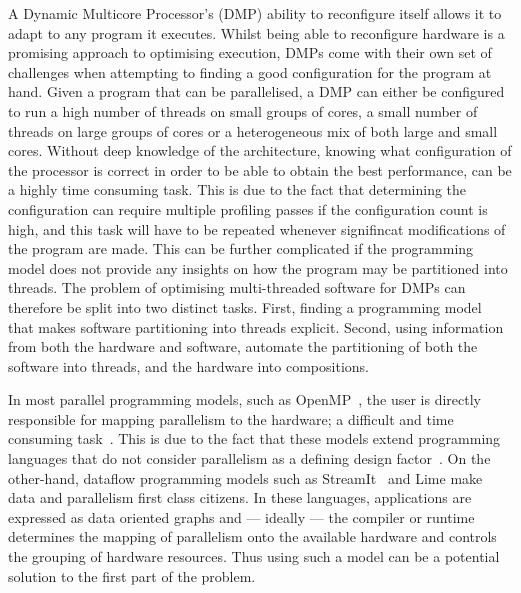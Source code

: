A Dynamic Multicore Processor's (DMP) ability to reconfigure itself allows it to adapt to any program it executes.
Whilst being able to reconfigure hardware is a promising approach to optimising execution, DMPs come with their own set of challenges when attempting to finding a good configuration for the program at hand.
Given a program that can be parallelised, a DMP can either be configured to run a high number of threads on small groups of cores, a small number of threads on large groups of cores or a heterogeneous mix of both large and small cores.
Without deep knowledge of the architecture, knowing what configuration of the processor is correct in order to be able to obtain the best performance, can be a highly time consuming task.
This is due to the fact that determining the configuration can require multiple profiling passes if the configuration count is high, and this task will have to be repeated whenever signifincat modifications of the program are made.
This can be further complicated if the programming model does not provide any insights on how the program may be partitioned into threads.
The problem of optimising multi-threaded software for DMPs can therefore be split into two distinct tasks.
First, finding a programming model that makes software partitioning into threads explicit.
Second, using information from both the hardware and software, automate the partitioning of both the software into threads, and the hardware into compositions.

In most parallel programming models, such as OpenMP~\cite{openmp}, the user is directly responsible for mapping parallelism to the hardware; a difficult and time consuming task~\cite{prabhu2011LanguagePar}.
This is due to the fact that these models extend programming languages that do not consider parallelism as a defining design factor~\cite{pingaliTao2011}.
On the other-hand, dataflow programming models such as StreamIt~\cite{theis2002streamit} and Lime \cite{auerbach2012lime} make data and parallelism first class citizens.
In these languages, applications are expressed as data oriented graphs and --- ideally --- the compiler or runtime determines the mapping of parallelism onto the available hardware and controls the grouping of hardware resources.
Thus using such a model can be a potential solution to the first part of the problem.

